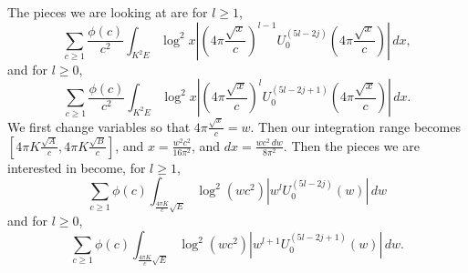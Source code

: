 \documentclass[reqno, 12pt]{amsart}
\renewcommand{\geq}{\geqslant}
\renewcommand{\leq}{\leqslant}
\newcommand{\chan}[1]{{\color{blue}\sf #1}}
\begin{document}
%
%
%

{The} pieces we are looking at are for $l \geq 1$,
\[ \sum_{c \geq 1} \frac{\phi(c)}{c^2} \int_{K^2E} \log^2 x \left|  \left( 4\pi \frac{\sqrt{x}}{c} \right) ^{l-1}  U_0^{(5l-2j)} \left( 4\pi \frac{\sqrt{x}}{c} \right) \right| \,dx, \]
and for $l \geq 0$, 
\[ \sum_{c \geq 1} \frac{\phi(c)}{c^2} \int_{K^2E} \log^2 x \left|  \left( 4\pi \frac{\sqrt{x}}{c} \right) ^{l}  U_0^{(5l-2j+1)} \left( 4\pi \frac{\sqrt{x}}{c} \right) \right| \,dx. \]
We first change variables so that $4\pi \frac{\sqrt{x}}{c} = w$. Then our integration range becomes $[4\pi K\frac{\sqrt{A}}{c},4\pi K\frac{\sqrt{B}}{c}]$, and $x = \frac{w^2 c^2}{16\pi^2}$, and  $dx = \frac{wc^2 \,dw}{8\pi^2} $.
Then the pieces we are interested in become, for $l \geq 1$, 
\[ \sum_{c \geq 1} \phi(c) \int_{\frac{4\pi K}{c} \sqrt{E}} \log^2 (wc^2) \left| w^l  U_0^{(5l-2j)} (w) \right| \,dw \]
and for $l \geq 0$, 
\[ \sum_{c \geq 1} \phi(c) \int_{\frac{4\pi K}{c} \sqrt{E}} \log^2 (wc^2) \left|  w^{l+1}  U_0^{(5l-2j+1)} (w) \right| \,dw. \]
\end{document}
